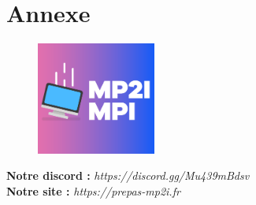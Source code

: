 \documentclass[aspectratio=169]{beamer}
\begin{document}
\section{Annexe}

\begin{frame}
    \begin{figure}
        \centering
        \includegraphics[width=0.35\textwidth]{ressource_diapo/logo_discord.png}
    \end{figure}
    \textbf{Notre discord :} \textit{https://discord.gg/Mu439mBdsv}\\
    \textbf{Notre site :} \textit{https://prepas-mp2i.fr}
\end{frame}
\end{document}
